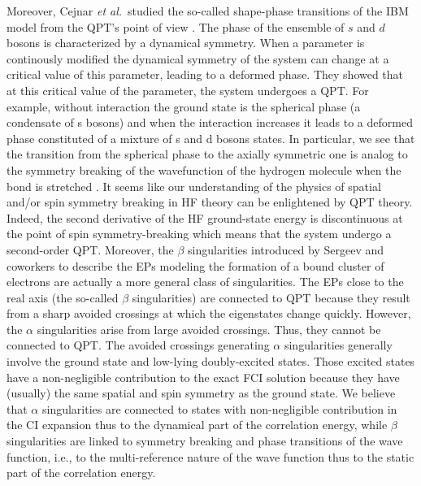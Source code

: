 \documentclass[aps,prb,reprint,noshowkeys,superscriptaddress]{revtex4-1}
\newcommand{\latin}[1]{#1}
\newcommand{\ie}{\latin{i.e.}}
\begin{document}
Moreover, Cejnar \textit{et al.}~studied the so-called shape-phase transitions of the IBM model from the QPT's point of view \cite{Cejnar_2000, Cejnar_2003, Cejnar_2007a, Cejnar_2009}. The phase of the ensemble of $s$ and $d$ bosons is characterized by a dynamical symmetry. When a parameter is continously modified the dynamical symmetry of the system can change at a critical value of this parameter, leading to a deformed phase. They showed that at this critical value of the parameter, the system undergoes a QPT. For example, without interaction the ground state is the spherical phase (a condensate of s bosons) and when the interaction increases it leads to a deformed phase constituted of a mixture of s and d bosons states. In particular, we see that the transition from the spherical phase to the axially symmetric one is analog to the symmetry breaking of the wavefunction of the hydrogen molecule when the bond is stretched \cite{SzaboBook}.
It seems like our understanding of the physics of spatial and/or spin symmetry breaking in HF theory can be enlightened by QPT theory. Indeed, the second derivative of the HF ground-state energy is discontinuous at the point of spin symmetry-breaking which means that the system undergo a second-order QPT. Moreover, the $\beta$ singularities introduced by Sergeev and coworkers to describe the EPs modeling the formation of a bound cluster of electrons are actually a more general class of singularities. The EPs close to the real axis (the so-called $\beta$ singularities) are connected to QPT because they result from a sharp avoided crossings at which the eigenstates change quickly. However, the $\alpha$ singularities arise from large avoided crossings. Thus, they cannot be connected to QPT. The avoided crossings generating $\alpha$ singularities generally involve the ground state and low-lying doubly-excited states. Those excited states have a non-negligible contribution to the exact FCI solution because they have (usually) the same spatial and spin symmetry as the ground state. We believe that $\alpha$ singularities are connected to states with non-negligible contribution in the CI expansion thus to the dynamical part of the correlation energy, while $\beta$ singularities are linked to symmetry breaking and phase transitions of the wave function, \ie, to the multi-reference nature of the wave function thus to the static part of the correlation energy.
\end{document}

